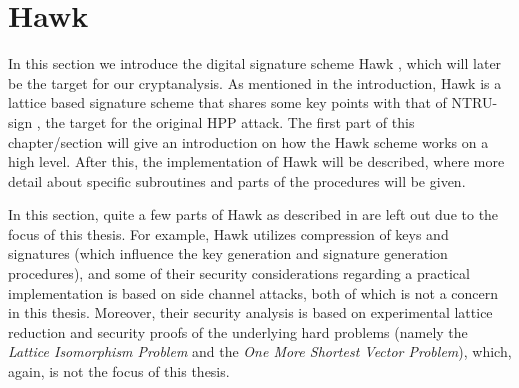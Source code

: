 \section{Hawk}
In this section we introduce the digital signature scheme Hawk \cite{HawkSpec24}, which will later be the target for our cryptanalysis.
As mentioned in the introduction, Hawk is a lattice based signature scheme that shares some key points with that of NTRU-sign \cite{HHPSW03}, the target for the original HPP attack.
The first part of this chapter/section will give an introduction on how the Hawk scheme works on a high level. After this, the implementation of Hawk will be described, where more detail about 
specific subroutines and parts of the procedures will be given.

In this section, quite a few parts of Hawk as described in \cite{HawkSpec24} are left out due to the focus of this thesis. For example, Hawk utilizes compression of keys and signatures 
(which influence the key generation and signature generation procedures),
and some of their security considerations regarding a practical implementation is based on side channel attacks, both of which is not a concern in this thesis.
Moreover, their security analysis is based on experimental lattice reduction and security proofs of the underlying hard problems (namely the \textit{Lattice Isomorphism Problem} and 
the \textit{One More Shortest Vector Problem}), which, again, is not the focus of this thesis. 

